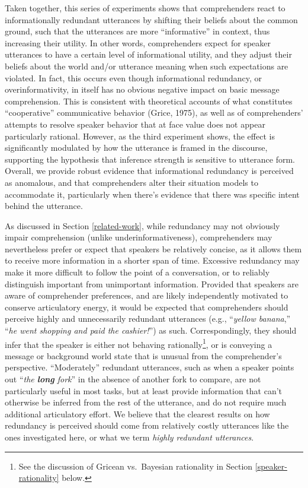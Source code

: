 Taken together, this series of experiments shows that comprehenders
react to informationally redundant utterances by shifting their beliefs
about the common ground, such that the utterances are more
\enquote{informative} in context, thus increasing their utility. In
other words, comprehenders expect for speaker utterances to have a
certain level of informational utility, and they adjust their beliefs
about the world and/or utterance meaning when such expectations are
violated. In fact, this occurs even though informational redundancy, or
overinformativity, in itself has no obvious negative impact on basic
message comprehension. This is consistent with theoretical accounts of
what constitutes \enquote{cooperative} communicative behavior (Grice,
1975), as well as of comprehenders' attempts to resolve speaker behavior
that at face value does not appear particularly rational. However, as
the third experiment shows, the effect is significantly modulated by how
the utterance is framed in the discourse, supporting the hypothesis that
inference strength is sensitive to utterance form. Overall, we provide
robust evidence that informational redundancy is perceived as anomalous,
and that comprehenders alter their situation models to accommodate it,
particularly when there's evidence that there was specific intent behind
the utterance.

As discussed in Section \ref{related-work}, while redundancy may not
obviously impair comprehension (unlike underinformativeness),
comprehenders may nevertheless prefer or expect that speakers be
relatively concise, as it allows them to receive more information in a
shorter span of time. Excessive redundancy may make it more difficult to
follow the point of a conversation, or to reliably distinguish important
from unimportant information. Provided that speakers are aware of
comprehender preferences, and are likely independently motivated to
conserve articulatory energy, it would be expected that comprehenders
should perceive highly and unnecessarily redundant utterances (e.g.,
\enquote{\emph{yellow banana},} \enquote{\emph{he went shopping and paid
the cashier!}}) as such. Correspondingly, they should infer that the
speaker is either not behaving rationally\footnote{See the discussion of
  Gricean vs.~Bayesian rationality in Section \ref{speaker-rationality}
  below.}, or is conveying a message or background world state that is
unusual from the comprehender's perspective. \enquote{Moderately}
redundant utterances, such as when a speaker points out
\enquote{\emph{the \textbf{long} fork}} in the absence of another fork
to compare, are not particularly useful in most tasks, but at least
provide information that can't otherwise be inferred from the rest of
the utterance, and do not require much additional articulatory effort.
We believe that the clearest results on how redundancy is perceived
should come from relatively costly utterances like the ones investigated
here, or what we term \emph{highly redundant utterances}.

